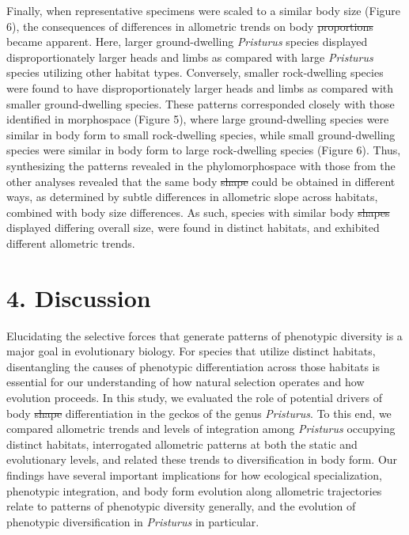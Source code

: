 \documentclass[
  11pt,
]{article}
\providecommand{\DIFaddtex}[1]{{\protect\color{blue}\uwave{#1}}} %
\providecommand{\DIFdeltex}[1]{{\protect\color{red}\sout{#1}}}                      %
\providecommand{\DIFaddbegin}{} %
\providecommand{\DIFaddend}{} %
\providecommand{\DIFdelbegin}{} %
\providecommand{\DIFdelend}{} %
\providecommand{\DIFadd}[1]{\texorpdfstring{\DIFaddtex{#1}}{#1}} %
\providecommand{\DIFdel}[1]{\texorpdfstring{\DIFdeltex{#1}}{}} %
\newcommand{\DIFscaledelfig}{0.5}
\newlength{\DIFdelgraphicswidth} %
\newlength{\DIFdelgraphicsheight} %
\newcommand{\DIFaddincludegraphics}[2][]{{\color{blue}\fbox{\DIFOincludegraphics[#1]{#2}}}} %
\newcommand{\DIFdelincludegraphics}[2][]{%
\sbox{\DIFdelgraphicsbox}{\DIFOincludegraphics[#1]{#2}}%
\settoboxwidth{\DIFdelgraphicswidth}{\DIFdelgraphicsbox} %
\settoboxtotalheight{\DIFdelgraphicsheight}{\DIFdelgraphicsbox} %
\scalebox{\DIFscaledelfig}{%
\parbox[b]{\DIFdelgraphicswidth}{\usebox{\DIFdelgraphicsbox}\\[-\baselineskip] \rule{\DIFdelgraphicswidth}{0em}}\llap{\resizebox{\DIFdelgraphicswidth}{\DIFdelgraphicsheight}{%
\setlength{\unitlength}{\DIFdelgraphicswidth}%
\begin{picture}(1,1)%
\thicklines\linethickness{2pt} %
{\color[rgb]{1,0,0}\put(0,0){\framebox(1,1){}}}%
{\color[rgb]{1,0,0}\put(0,0){\line( 1,1){1}}}%
{\color[rgb]{1,0,0}\put(0,1){\line(1,-1){1}}}%
\end{picture}%
}\hspace*{3pt}}} %
} %
\DeclareRobustCommand{\DIFaddbegin}{\DIFOaddbegin \let\includegraphics\DIFaddincludegraphics} %
\DeclareRobustCommand{\DIFaddend}{\DIFOaddend \let\includegraphics\DIFOincludegraphics} %
\DeclareRobustCommand{\DIFdelbegin}{\DIFOdelbegin \let\includegraphics\DIFdelincludegraphics} %
\DeclareRobustCommand{\DIFdelend}{\DIFOaddend \let\includegraphics\DIFOincludegraphics} %
\begin{document}
Finally, when representative specimens were scaled to a similar body
size (Figure 6), the \DIFaddbegin \DIFadd{anatomical }\DIFaddend consequences of differences in
allometric trends on body \DIFdelbegin \DIFdel{proportions }\DIFdelend \DIFaddbegin \DIFadd{form }\DIFaddend became apparent. Here, larger
ground-dwelling \emph{Pristurus} species displayed disproportionately
larger heads and limbs as compared with large \emph{Pristurus} species
utilizing other habitat types. Conversely, smaller rock-dwelling species
were found to have disproportionately larger heads and limbs as compared
with smaller ground-dwelling species. These patterns corresponded
closely with those identified in morphospace (Figure 5), where large
ground-dwelling species were similar in body form to small rock-dwelling
species, while small ground-dwelling species were similar in body form
to large rock-dwelling species (Figure 6). Thus, synthesizing the
patterns revealed in the phylomorphospace with those from the other
analyses revealed that the same body \DIFdelbegin \DIFdel{shape }\DIFdelend \DIFaddbegin \DIFadd{proportions }\DIFaddend could be obtained in
different ways, as determined by subtle differences in allometric slope
across habitats, combined with body size differences. As such, species
with similar body \DIFdelbegin \DIFdel{shapes }\DIFdelend \DIFaddbegin \DIFadd{proportinos }\DIFaddend displayed differing overall size, were
found in distinct habitats, and exhibited different allometric trends.
\hfill\break

\hypertarget{discussion}{%
\section{4. Discussion}\label{discussion}}

Elucidating the selective forces that generate patterns of phenotypic
diversity is a major goal in evolutionary biology. For species that
utilize distinct habitats, disentangling the causes of phenotypic
differentiation across those habitats is essential for our understanding
of how natural selection operates and how evolution proceeds. In this
study, we evaluated the role of potential drivers of body \DIFdelbegin \DIFdel{shape
}\DIFdelend \DIFaddbegin \DIFadd{form
}\DIFaddend differentiation in the geckos of the genus \emph{Pristurus}. To this
end, we compared allometric trends and levels of integration among
\emph{Pristurus} occupying distinct habitats, interrogated allometric
patterns at both the static and evolutionary levels, and related these
trends to diversification in body form. Our findings have several
important implications for how ecological specialization, phenotypic
integration, and body form evolution along allometric trajectories
relate to patterns of phenotypic diversity generally, and the evolution
of phenotypic diversification in \emph{Pristurus} in particular.
\hfill\break
\end{document}
